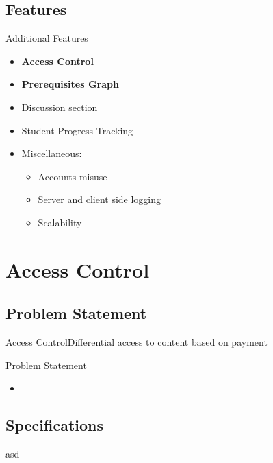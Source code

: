 \documentclass{beamer}
\begin{document}
\subsection{Features}

\begin{frame}{Additional Features}
	\begin{itemize}
		\item \textbf{Access Control} %
		\item \textbf{Prerequisites Graph} %
		\item Discussion section %
		\item Student Progress Tracking
		\item Miscellaneous:
		\begin{itemize}
			\item Accounts misuse
			\item Server and client side logging
			\item Scalability
		\end{itemize}
	\end{itemize}
\end{frame}

\section{Access Control}

\subsection{Problem Statement}

\begin{frame}{Access Control}{Differential access to content based on payment}
	\begin{block}{Problem Statement}
		\begin{itemize}
			\item 
		\end{itemize}
	\end{block}
\end{frame}

\subsection{Specifications}

\begin{frame}
	asd
\end{frame}
\end{document}
